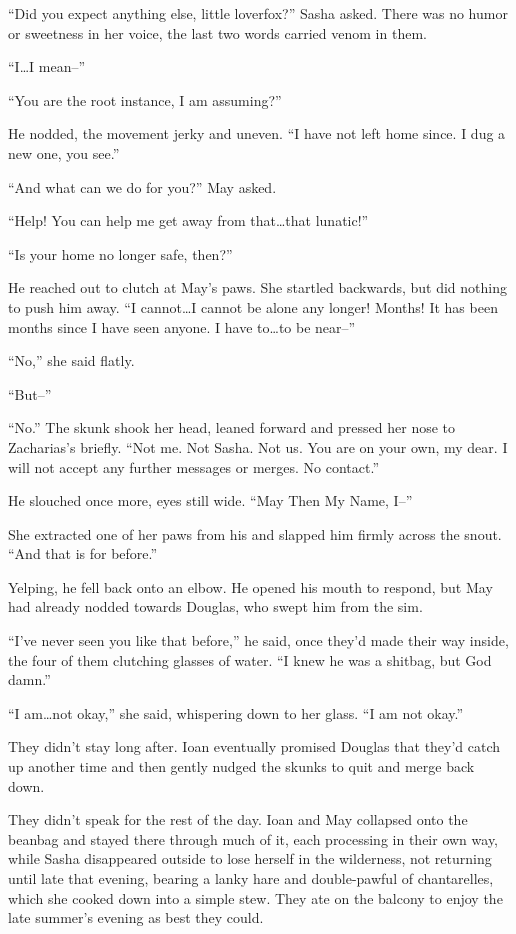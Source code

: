 ``Did you expect anything else, little loverfox?'' Sasha asked. There was no humor or sweetness in her voice, the last two words carried venom in them.

``I\ldots I mean--''

``You are the root instance, I am assuming?''

He nodded, the movement jerky and uneven. ``I have not left home since. I dug a new one, you see.''

``And what can we do for you?'' May asked.

``Help! You can help me get away from that\ldots that lunatic!''

``Is your home no longer safe, then?''

He reached out to clutch at May's paws. She startled backwards, but did nothing to push him away. ``I cannot\ldots I cannot be alone any longer! Months! It has been months since I have seen anyone. I have to\ldots to be near--''

``No,'' she said flatly.

``But--''

``No.'' The skunk shook her head, leaned forward and pressed her nose to Zacharias's briefly. ``Not me. Not Sasha. Not us. You are on your own, my dear. I will not accept any further messages or merges. No contact.''

He slouched once more, eyes still wide. ``May Then My Name, I--''

She extracted one of her paws from his and slapped him firmly across the snout. ``And that is for before.''

Yelping, he fell back onto an elbow. He opened his mouth to respond, but May had already nodded towards Douglas, who swept him from the sim.

``I've never seen you like that before,'' he said, once they'd made their way inside, the four of them clutching glasses of water. ``I knew he was a shitbag, but God damn.''

``I am\ldots not okay,'' she said, whispering down to her glass. ``I am not okay.''

They didn't stay long after. Ioan eventually promised Douglas that they'd catch up another time and then gently nudged the skunks to quit and merge back down.

They didn't speak for the rest of the day. Ioan and May collapsed onto the beanbag and stayed there through much of it, each processing in their own way, while Sasha disappeared outside to lose herself in the wilderness, not returning until late that evening, bearing a lanky hare and double-pawful of chantarelles, which she cooked down into a simple stew. They ate on the balcony to enjoy the late summer's evening as best they could.

